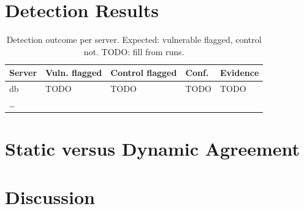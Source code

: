 \section{Detection Results}
\label{sec:detection}


\begin{table}[htbp]
\centering
\small
\begin{tabular}{p{2.6cm} p{2.4cm} p{2.4cm} p{2.0cm} p{2.4cm}}
\hline
\textbf{Server} & \textbf{Vuln. flagged} & \textbf{Control flagged} & \textbf{Conf.} & \textbf{Evidence} \\
\hline
db & TODO & TODO & TODO & TODO \\
\dots & & & & \\
\hline
\end{tabular}
\caption{Detection outcome per server. Expected: vulnerable flagged, control not. TODO: fill from runs.}
\label{tab:detection}
\end{table}

\section{Static versus Dynamic Agreement}
\label{sec:agreement}


\section{Discussion}
\label{sec:discussion}


